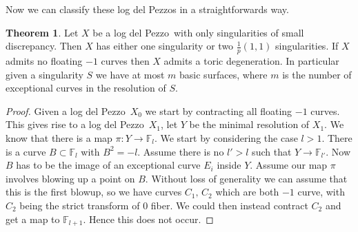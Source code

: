 \documentclass[11pt]{amsbook}
\theoremstyle{definition}
\newtheorem{thm}{Theorem}[section]
\theoremstyle{definition}
\theoremstyle{definition}
\theoremstyle{definition}
\theoremstyle{definition}
\theoremstyle{definition}
\theoremstyle{definition}
\theoremstyle{definition}
\newcommand{\ldp}{log del Pezzo}
\newcommand{\mb}[1]{\mathbb{#1}}
\begin{document}
Now we can classify these log del Pezzos in a straightforwards way. 
\begin{thm}\label{ThmOnSing}
Let $X$ be a \ldp\ with only singularities of small discrepancy. Then $X$ has either one singularity or two $\frac{1}{p}(1,1)$ singularities. If $X$ admits no floating $-1$ curves then $X$ admits a toric degeneration. In particular given a singularity $S$ we have at most $m$ basic surfaces, where $m$ is the number of exceptional curves in the resolution of $S$.
\end{thm}
\begin{proof}
Given a \ldp\ $X_0$ we start by contracting all floating $-1$ curves. This gives rise to a \ldp\ $X_1$, let $Y$ be the minimal resolution of $X_1$. We know that there is a map $\pi \colon Y \rightarrow \mathbb{F}_l$. We start by considering the case $l > 1$. There is a curve $B \subset \mathbb{F}_l$ with $B^2 = -l$. Assume there is no  $l' >l$ such that $Y \rightarrow \mb{F}_{l'}$. Now $B$ has to be the image of an exceptional curve $E_i$ inside $Y$. Assume our map $\pi$ involves blowing up a point on $B$. Without loss of generality we can assume that this is the first blowup, so we have curves $C_1, \, C_2$ which are both $-1$ curve, with $C_2$ being the strict transform of $0$ fiber. We could then instead contract $C_2$ and get a map to $\mb{F}_{l+1}$. Hence this does not occur. 



\end{proof}
\end{document}
